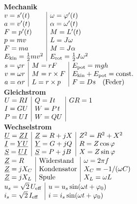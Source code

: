 \documentclass[a4paper,10pt,fleqn,twoside,twocolumn,dvipdfmx]{scrartcl}
\newcommand{\strong}[1]{\textsf{\textbf{#1}}}
\begin{document}
\noindent\strong{Mechanik}\\
$\begin{array}{@{}l|l}
v = s'(t) & \omega = \varphi'(t)\\
a = v'(t) & \alpha = \omega'(t)\\
F = p'(t) & M = L'(t)\\
p = mv & L = J\omega\\
F = ma & M = J\alpha\\
E_\mathrm{kin} = \frac{1}{2}mv^2
& E_\mathrm{rot} = \frac{1}{2}J\omega^2
\end{array}$\\[2pt]
$\begin{array}{@{}l|l|l}
s=\varphi r& M=rF & E_\mathrm{pot} = mgh\\
v=\omega r & M=r\times F & E_\mathrm{kin}+E_\mathrm{pot} = \mathrm{const.}\\
a=\alpha r& L=r\times p & F = Ds\quad \mathrm{(Feder)}
\end{array}$\\[4pt]
\strong{Gleichstrom}\\
$\begin{array}{@{}l|l|l}
U=RI & Q=It & GR=1\\
I=GU & W=P\;\!t\\
P=UI & W=QU\\
\end{array}$\\[4pt]
\strong{Wechselstrom}\\[2pt]
$\begin{array}{@{}l|l|l}
\underline U = \underline Z\underline I
& \underline Z = R+jX
& Z^2 = R^2+X^2\\
\underline I=\underline Y\underline U
& \underline Y = G+jQ
& R = Z\cos\varphi\\
\underline S = \underline U\underline I
& \underline S = P+jB
& X = Z\sin\varphi
\end{array}$\\[4pt]
$\begin{array}{@{}l|l|l}
\underline Z = R & \mathrm{Widerstand}
& \omega = 2\pi f\\
\underline Z = jX_C & \mathrm{Kondensator}
& X_C = -1/(\omega C)\\
\underline Z = jX_L & \mathrm{Spule}
& X_L = \omega L
\end{array}$\\[4pt]
$\begin{array}{@{}l|l}
u_s = \sqrt{2}\,U_\mathrm{eff}
& u = u_s\sin(\omega t+\varphi_0)\\
i_s = \sqrt{2}\,I_\mathrm{eff}
& i = i_s\sin(\omega t+\varphi_0)
\end{array}$\\[4pt]
\end{document}
